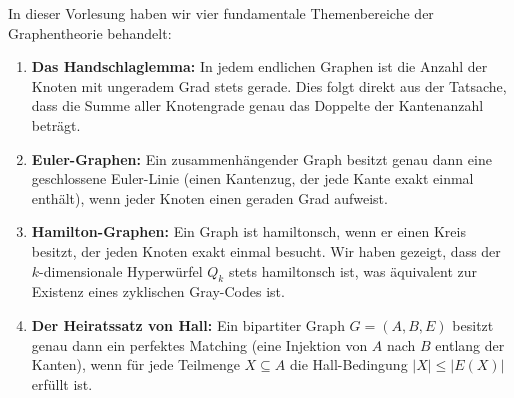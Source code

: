 \begin{nice-box}
In dieser Vorlesung haben wir vier fundamentale Themenbereiche der Graphentheorie behandelt:
\begin{enumerate}[label=\textbf{(\arabic*)}]
    \item \textbf{Das Handschlaglemma:} In jedem endlichen Graphen ist die Anzahl der Knoten mit ungeradem Grad stets gerade. Dies folgt direkt aus der Tatsache, dass die Summe aller Knotengrade genau das Doppelte der Kantenanzahl beträgt.
    \item \textbf{Euler-Graphen:} Ein zusammenhängender Graph besitzt genau dann eine geschlossene Euler-Linie (einen Kantenzug, der jede Kante exakt einmal enthält), wenn jeder Knoten einen geraden Grad aufweist.
    \item \textbf{Hamilton-Graphen:} Ein Graph ist hamiltonsch, wenn er einen Kreis besitzt, der jeden Knoten exakt einmal besucht. Wir haben gezeigt, dass der $k$-dimensionale Hyperwürfel $Q_k$ stets hamiltonsch ist, was äquivalent zur Existenz eines zyklischen Gray-Codes ist.
    \item \textbf{Der Heiratssatz von Hall:} Ein bipartiter Graph $G = (A, B, E)$ besitzt genau dann ein perfektes Matching (eine Injektion von $A$ nach $B$ entlang der Kanten), wenn für jede Teilmenge $X \subseteq A$ die Hall-Bedingung $|X| \le |E(X)|$ erfüllt ist.
\end{enumerate}
\end{nice-box}

